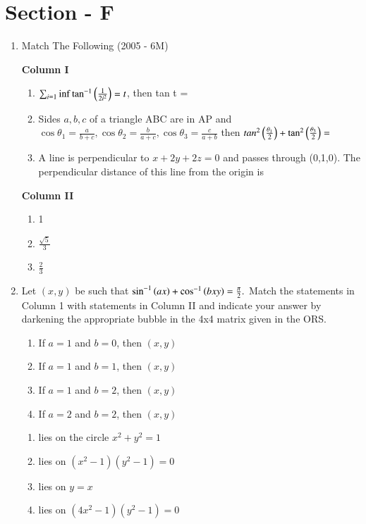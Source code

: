 \documentclass[journal,12pt,twocolumn]{IEEEtran}
\theoremstyle{remark}
\begin{document}
\section*{Section - F}
\begin{enumerate}
	\item{
		Match The Following \hfill (2005 - 6M)
		\begin{multicols}{2}
			\textbf{Column I}\\
			\begin{enumerate}
				\item{$\sum_{i=1}{\inf}\tan^{-1}\left(\frac{1}{2i^2}\right)=t$, then tan t =}\\
				\item{Sides $a,b,c$ of a triangle ABC are in AP and $\cos\theta_1=\frac{a}{b+c}, \cos\theta_2=\frac{b}{a+c}, \cos\theta_3=\frac{c}{a+b}$ then $tan^2\left(\frac{\theta_1}{2}\right)+\tan^2\left(\frac{\theta_3}{2}\right) = $}\\
				\item{A line is perpendicular to $x+2y+2z=0$ and passes through (0,1,0). The perpendicular distance of this line from the origin is}
			\end{enumerate}
			\columnbreak
			\textbf{Column II}\\
			\begin{enumerate}
				\item{1}\\
				\item{$\frac{\sqrt{5}}{3}$}\\
				\item{$\frac{2}{3}$}
			\end{enumerate}
		\end{multicols}}
	\item{
		Let $(x,y)$ be such that $\sin^{-1}\left(ax\right)+\cos^{-1}\left(bxy\right)=\frac{\pi}{2}.\\$
		Match the statements in Column 1 with statements in Column II and indicate your answer by darkening the appropriate bubble in the 4x4 matrix given in the ORS.
		\begin{multicols}{2}
			\begin{enumerate}
				\item{If $a=1$ and $b=0$, then $(x, y)$}
				\item{If $a=1$ and $b=1$, then $(x, y)$}
				\item{If $a=1$ and $b=2$, then $(x, y)$}
				\item{If $a=2$ and $b=2$, then $(x, y)$}
			\end{enumerate}
			\columnbreak
			\begin{enumerate}
				\item{lies on the circle $x^2 + y^2 = 1$}
				\item{lies on $(x^2-1)(y^2-1)=0$}
				\item{lies on $y=x$}
				\item{lies on $(4x^2-1)(y^2-1)=0$}
			\end{enumerate}
		\end{multicols}}
	

\end{enumerate}
\end{document}

